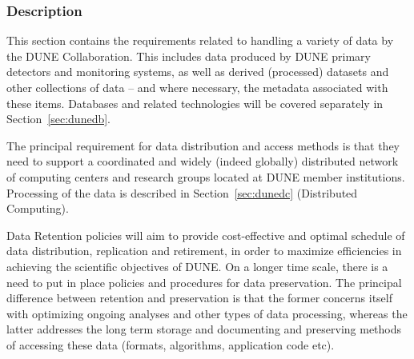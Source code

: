 \subsubsection{Description}
This section contains the requirements related to handling a variety of data by the DUNE Collaboration.
This includes data produced by DUNE primary detectors and monitoring systems, as well as derived (processed)
datasets and other collections of data -- and where necessary, the metadata associated with these items.
Databases and related technologies will be covered separately in Section~\ref{sec:dunedb}.

The principal requirement for data distribution and access methods is that they need to support a coordinated and widely (indeed globally) distributed network of computing centers and research groups located at DUNE member institutions. Processing of the data is described in Section~\ref{sec:dunedc} (Distributed Computing).

Data Retention policies will aim to provide cost-effective and optimal schedule of data distribution, replication and retirement, in order to maximize
efficiencies in achieving the scientific objectives of DUNE. On a longer time scale, there is a need to put in place policies and procedures for data preservation.
The principal difference between retention and preservation is that the former concerns itself with optimizing ongoing analyses and other types of data processing,
whereas the latter addresses the long term storage and documenting and preserving methods of accessing these data (formats, algorithms, application code etc).


